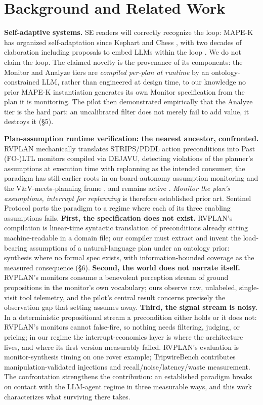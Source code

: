 \documentclass[acmsmall,screen,review,anonymous]{acmart}
\begin{document}
\section{Background and Related Work}
\textbf{Self-adaptive systems.} SE readers will correctly recognize the loop: MAPE-K has organized self-adaptation since Kephart and Chess \cite{ref23}, with two decades of elaboration \cite{ref24} including proposals to embed LLMs within the loop \cite{ref25, ref26}. We do not claim the loop. The claimed novelty is the provenance of its components: the Monitor and Analyze tiers are \emph{compiled per-plan at runtime} by an ontology-constrained LLM, rather than engineered at design time, to our knowledge no prior MAPE-K instantiation generates its own Monitor specification from the plan it is monitoring. The pilot then demonstrated empirically that the Analyze tier is the hard part: an uncalibrated filter does not merely fail to add value, it destroys it (\S5).

\textbf{Plan-assumption runtime verification: the nearest ancestor, confronted.} RVPLAN \cite{ref6, ref34} mechanically translates STRIPS/PDDL action preconditions into Past (FO-)LTL monitors compiled via DEJAVU, detecting violations of the planner's assumptions at execution time with replanning as the intended consumer; the paradigm has still-earlier roots in on-board-autonomy assumption monitoring \cite{ref35} and the V\&V-meets-planning frame \cite{ref36}, and remains active \cite{ref37}. \emph{Monitor the plan's assumptions, interrupt for replanning} is therefore established prior art. Sentinel Protocol ports the paradigm to a regime where each of its three enabling assumptions fails. \textbf{First, the specification does not exist.} RVPLAN's compilation is linear-time syntactic translation of preconditions already sitting machine-readable in a domain file; our compiler must extract and invent the load-bearing assumptions of a natural-language plan under an ontology prior: synthesis where no formal spec exists, with information-bounded coverage as the measured consequence (\S6). \textbf{Second, the world does not narrate itself.} RVPLAN's monitors consume a benevolent perception stream of ground propositions in the monitor's own vocabulary; ours observe raw, unlabeled, single-visit tool telemetry, and the pilot's central result concerns precisely the observation gap that setting assumes away. \textbf{Third, the signal stream is noisy.} In a deterministic propositional stream a precondition either holds or it does not: RVPLAN's monitors cannot false-fire, so nothing needs filtering, judging, or pricing; in our regime the interrupt-economics layer is where the architecture lives, and where its first version measurably failed. RVPLAN's evaluation is monitor-synthesis timing on one rover example; TripwireBench contributes manipulation-validated injections and recall/noise/latency/waste measurement. The confrontation strengthens the contribution: an established paradigm breaks on contact with the LLM-agent regime in three measurable ways, and this work characterizes what surviving there takes.
\end{document}
